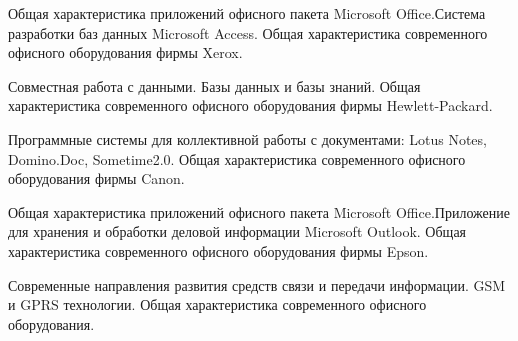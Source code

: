 \documentclass[
	14pt,
	a4paper,
	]
	{scrartcl}
\begin{document}
\vfill
\z Общая характеристика приложений офисного пакета Microsoft Office.Система разработки баз данных Microsoft Access.
 \vfill
\z Общая характеристика современного офисного оборудования фирмы Xerox.
 \vfill

\vfill

\newpage


\shapk
{}
\setcounter{zad}{0}

\vfill
\z Совместная работа с данными. Базы данных и базы знаний.
 \vfill
\z Общая характеристика современного офисного оборудования фирмы Hewlett-Packard.
 \vfill

\vfill

\newpage


\shapk
{}
\setcounter{zad}{0}

\vfill
\z Программные системы для коллективной работы с документами: Lotus Notes, Domino.Doc, Sometime2.0.
 \vfill
\z Общая характеристика современного офисного оборудования фирмы Canon.
 \vfill

\vfill

\newpage


\shapk
{}
\setcounter{zad}{0}

\vfill
\z Общая характеристика приложений офисного пакета Microsoft Office.Приложение для хранения и обработки деловой информации Microsoft Outlook.
 \vfill
\z Общая характеристика современного офисного оборудования фирмы Epson.
 \vfill

\vfill

\newpage


\shapk
{}
\setcounter{zad}{0}

\vfill
\z Современные направления развития средств связи и передачи информации. GSM и GPRS технологии.
 \vfill
\z Общая характеристика современного офисного оборудования.
 \vfill

\vfill

\newpage
\end{document}
